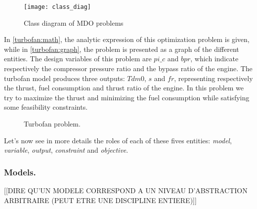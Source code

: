 \begin{figure}[t]
	\centering
	\texttt{[image: class\_diag]}
	\caption{Class diagram of MDO problems}
	\label{class_diag}
\end{figure}

In \figurename{} \ref{turbofan:math}, the analytic expression of this optimization problem is given, while in \figurename{} \ref{turbofan:graph}, the problem is presented as a graph of the different entities. The design variables of this problem are $pi\_c$ and $bpr$, which indicate respectively the compressor pressure ratio and the bypass ratio of the engine. The turbofan model produces three outputs: $Tdm0$, $s$ and $fr$, representing respectively the thrust, fuel consumption and thrust ratio of the engine. In this problem we try to maximize the thrust and minimizing the fuel consumption while satisfying some feasibility constraints. 

\begin{figure}[]
\centering
{}\hfill%

\caption{Turbofan problem.}
\label{turbofan}

\end{figure}

Let's now see in more details the roles of each of these fives entities: \emph{model}, \emph{variable}, \emph{output}, \emph{constraint} and \emph{objective}.

\subsubsection*{Models.}

[[DIRE QU'UN MODELE CORRESPOND A UN NIVEAU D'ABSTRACTION ARBITRAIRE (PEUT ETRE UNE DISCIPLINE ENTIERE)]]

